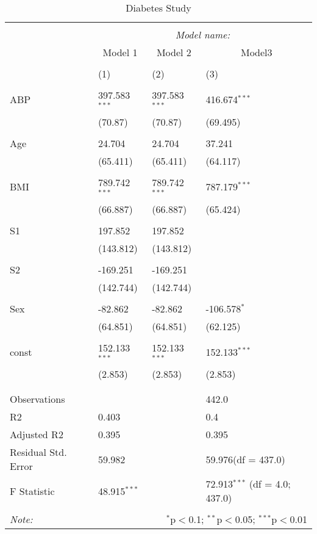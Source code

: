 \documentclass[12pt]{article}
\numberwithin{equation}{subsection}
\begin{document}
\begin{table}[!htbp] \centering
  \caption{Diabetes Study}
  \label{}
\begin{tabularx}{\textwidth}{lXXX}
\\[-1.8ex]\hline
\hline \\[-1.8ex]
& \multicolumn{3}{c}{\textit{Model name:}} \
\cr \cline{3-4}
\\[-1.8ex] & \multicolumn{1}{c}{Model 1} & \multicolumn{1}{c}{Model 2} & \multicolumn{1}{c}{Model3}  \\
\\[-1.8ex] & (1) & (2) & (3) \\
\hline \\[-1.8ex]
 ABP & 397.583$^{***}$ & 397.583$^{***}$ & 416.674$^{***}$ \\
  & (70.87) & (70.87) & (69.495) \\
  & & & \\
 Age & 24.704$^{}$ & 24.704$^{}$ & 37.241$^{}$ \\
  & (65.411) & (65.411) & (64.117) \\
  & & & \\
 BMI & 789.742$^{***}$ & 789.742$^{***}$ & 787.179$^{***}$ \\
  & (66.887) & (66.887) & (65.424) \\
  & & & \\
 S1 & 197.852$^{}$ & 197.852$^{}$ & \\
  & (143.812) & (143.812) & \\
  & & & \\
 S2 & -169.251$^{}$ & -169.251$^{}$ & \\
  & (142.744) & (142.744) & \\
  & & & \\
 Sex & -82.862$^{}$ & -82.862$^{}$ & -106.578$^{*}$ \\
  & (64.851) & (64.851) & (62.125) \\
  & & & \\
 const & 152.133$^{***}$ & 152.133$^{***}$ & 152.133$^{***}$ \\
  & (2.853) & (2.853) & (2.853) \\
  & & & \\
\hline \\[-1.8ex]
 Observations &   &   & 442.0 \\
 R${2}$ & 0.403 &   & 0.4 \\
 Adjusted R${2}$ & 0.395 &   & 0.395 \\
 Residual Std. Error & 59.982 &   & 59.976(df = 437.0)  \\
 F Statistic & 48.915$^{***}$  &     & 72.913$^{***}$ (df = 4.0; 437.0) \\
\hline
\hline \\[-1.8ex]
\textit{Note:} & \multicolumn{3}{r}{$^{*}$p$<$0.1; $^{**}$p$<$0.05; $^{***}$p$<$0.01} \\
\end{tabularx}
\end{table}
\end{document}
